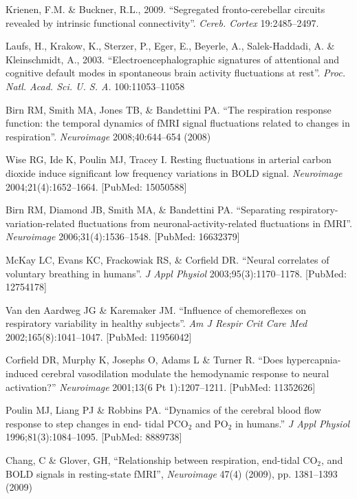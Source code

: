 \documentclass[twoside,twocolumn]{article}
\begin{document}
\begin{thebibliography}{99}
	 Krienen, F.M. \& Buckner, R.L., 2009. ``Segregated fronto-cerebellar circuits revealed by intrinsic functional connectivity''. {\em Cereb. Cortex} 19:2485–2497.
	
	 Laufs, H., Krakow, K., Sterzer, P., Eger, E., Beyerle, A., Salek-Haddadi, A. \& Kleinschmidt, A., 2003. ``Electroencephalographic signatures of attentional and cognitive default modes in spontaneous brain activity ﬂuctuations at rest''. {\em Proc. Natl. Acad. Sci. U. S. A.} 100:11053–11058

     Birn RM, Smith MA, Jones TB, \& Bandettini PA. ``The respiration response function: the temporal dynamics of fMRI signal fluctuations related to changes in respiration''. {\em Neuroimage} 2008;40:644–654 (2008)

	 Wise RG, Ide K, Poulin MJ, Tracey I. Resting fluctuations in arterial carbon dioxide induce significant low frequency variations in BOLD signal. {\em Neuroimage} 2004;21(4):1652–1664. [PubMed: 15050588]
	
	 Birn RM, Diamond JB, Smith MA, \& Bandettini PA. ``Separating respiratory-variation-related fluctuations from neuronal-activity-related fluctuations in fMRI''. {\em Neuroimage} 2006;31(4):1536–1548. [PubMed: 16632379]
	
	 McKay LC, Evans KC, Frackowiak RS, \& Corfield DR. ``Neural correlates of voluntary breathing in humans''. {\em J Appl Physiol} 2003;95(3):1170–1178. [PubMed: 12754178]
	
	 Van den Aardweg JG \& Karemaker JM. ``Influence of chemoreflexes on respiratory variability in healthy subjects''. {\em Am J Respir Crit Care Med} 2002;165(8):1041–1047. [PubMed: 11956042]
	
	 Corfield DR, Murphy K, Josephs O, Adams L \& Turner R. ``Does hypercapnia-induced cerebral vasodilation modulate the hemodynamic response to neural activation?'' {\em Neuroimage} 2001;13(6 Pt 1):1207–1211. [PubMed: 11352626]
	
		Poulin MJ, Liang PJ \& Robbins PA. ``Dynamics of the cerebral blood flow response to step changes in end- tidal PCO$_2$ and PO$_2$ in humans.'' {\em J Appl Physiol} 1996;81(3):1084–1095. [PubMed: 8889738]
	
	 Chang, C \& Glover, GH, ``Relationship between respiration, end-tidal CO$_2$, and BOLD signals in resting-state fMRI'', {\em Neuroimage} 47(4) (2009), pp. 1381–1393 (2009)
 

\end{thebibliography}
\end{document}
